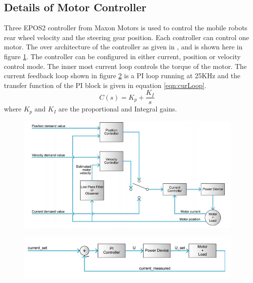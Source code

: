 \subsection{Details of Motor Controller}
Three EPOS2 controller from Maxon Motors is used to control the mobile robots rear wheel velocity and the steering gear position. Each controller can control one motor. The over architecture of the controller  as given in \cite{maxonAutoTune}, \cite{maxonAppNotesPosition} and is shown here in  figure \ref{fig:EPOS4}. The controller can be configured in either current, position or velocity control mode. The inner most current loop controls the torque of the motor.
 The current feedback loop shown in figure \ref{fig:curloop} is a PI loop running at 25KHz and the transfer function of the PI block is given in equation \ref{eqn:curLoop}. 
 \begin{equation}
 	C(s)=K_p + \frac{K_I}{s}
 	\label{eqn:curLoop}
 \end{equation}
 where $K_p$ and $ K_I$ are the proportional and Integral gains.
   \begin{figure}
 	\includegraphics[width=\linewidth,keepaspectratio]{Chapter5/fig/overallcontorl}
 	\label{fig:EPOS4} 
 \end{figure}
 \begin{figure}
 	\includegraphics[width=\linewidth,keepaspectratio]{Chapter5/fig/currentLoop}
 	\label{fig:curloop} 
 \end{figure}
 
